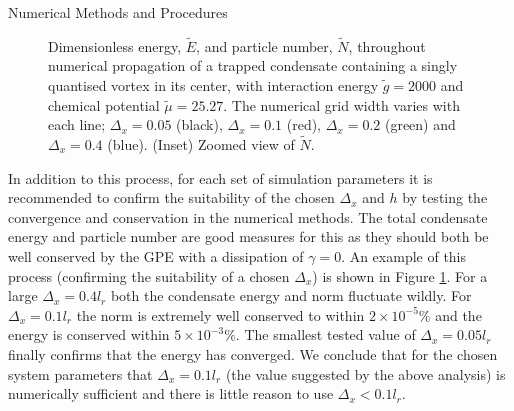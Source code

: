 \begin{chapter}{\label{cha:numerics}Numerical Methods and Procedures}
\begin{figure}[!ht]
  \caption{Dimensionless energy, $\tilde{E}$, and particle number, $\tilde{N}$, throughout numerical propagation of a trapped condensate containing a singly quantised vortex in its center, with interaction energy $\tilde{g}=2000$ and chemical potential $\tilde{\mu}=25.27$. The numerical grid width varies with each line; $\Delta_x = 0.05$ (black), $\Delta_x = 0.1$ (red), $\Delta_x = 0.2$ (green) and $\Delta_x = 0.4$ (blue). (Inset) Zoomed view of $\tilde{N}$.}\label{fig_energ_norm_cons}
 \end{figure}

  In addition to this process, for each set of simulation parameters it is recommended to confirm the suitability of the chosen $\Delta_x$ and $h$ by testing the convergence and conservation in the numerical methods. The total condensate energy and particle number are good measures for this as they should both be well conserved by the GPE with a dissipation of $\gamma=0$. An example of this process (confirming the suitability of a chosen $\Delta_x$) is shown in Figure \ref{fig_energ_norm_cons}. For a large $\Delta_x=0.4l_r$ both the condensate energy and norm fluctuate wildly. For $\Delta_x=0.1l_r$ the norm is extremely well conserved to within $2\times 10^{-5}\%$ and the energy is conserved within $5\times 10^{-3}\%$. The smallest tested value of $\Delta_x=0.05l_r$ finally confirms that the energy has converged. We conclude that for the chosen system parameters that $\Delta_x=0.1l_r$ (the value suggested by the above analysis) is numerically sufficient and there is little reason to use $\Delta_x<0.1l_r$.


\end{chapter}

